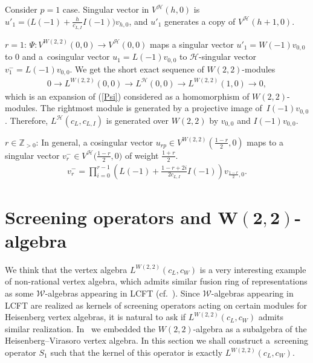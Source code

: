\documentclass[pdftex]{sigma}
\numberwithin{equation}{section}
\newcommand{\N}{{\mathbb Z}_{> 0} }
\newcommand{\HVir}{\mathcal H}
\begin{document}
\begin{Example} \label{verma_prim}
Consider $p=1$ case. Singular vector in $V^{\HVir}(h,0) $ is $u'_{1}=\big( L(-1) +\frac{h}{c_{L,I}}I(-1) \big) v_{h,0}$, and $u'_{1}$ generates a copy of $V^{\HVir}(h+1,0) $.

$r=1$: $\Psi \colon V^{W(2,2)}(0,0) \rightarrow V^{\HVir}(0,0) $ maps a singular vector $u'_1 = W(-1) v_{0,0}$ to $0$ and a~cosingular vector $u_1 = L(-1) v_{0,0}$ to $\HVir$-singular vector $v_1^- = L(-1) v_{0,0}$. We get the short exact sequence of $W(2,2)$-modules
\begin{gather*}
0\rightarrow L^{W(2,2)}(0,0) \rightarrow L^{\HVir}(0,0) \rightarrow L^{W(2,2)}(1,0) \rightarrow 0,
\end{gather*}
which is an expansion of (\ref{Psi}) considered as a homomorphism of $W(2,2)$-modules. The rightmost module is generated by a projective image of~$I(-1)v_{0,0}$. Therefore, $L^{\HVir}(c_L, c_{L,I})$ is generated over $W(2,2)$ by $v_{0,0}$ and $I(-1)v_{0,0}$.

$r\in \N$: In general, a cosingular vector $u_{rp}\in V^{W(2,2)}\left( \frac{1-r}{2},0\right) $ maps to a singular vector $v_r^- \in V^{
\HVir}\big( \frac{1-r}{2},0\big)$ of weight ${\frac{1+r}{2}}$.
\begin{gather*}
v_r^- = \prod\limits_{i=0}^{r-1}\left( L(-1) +\frac{1-r+2i}{2c_{L,I}}I(-1) \right) v_{\frac{1-r}{2},0}.
\end{gather*}
\end{Example}

\section[Screening operators and $W(2,2)$-algebra]{Screening operators and $\boldsymbol{W(2,2)}$-algebra}\label{screenings}

We think that the vertex algebra $L^{W(2,2)} (c_L, c_W) $ is a very interesting example of non-rational vertex algebra, which admits similar fusion ring of representations as some ${\mathcal W}$-algebras appearing in LCFT (cf.\ \cite{A1,AdM1,CM,FGST}). Since $\mathcal W$-algebras appearing in LCFT are realized as kernels of screening operators acting on certain modules for Heisenberg vertex algebras, it is natural to ask if $L^{W(2,2)} (c_L, c_W) $ admits similar realization. In~\cite{nas} we embedded the $W(2,2)$-algebra as a subalgebra of the Heisenberg--Virasoro vertex algebra. In this section we shall construct a~screening operator $S_1$ such that the kernel of this operator is exactly $L^{W(2,2)} (c_L, c_W) $.
\end{document}
